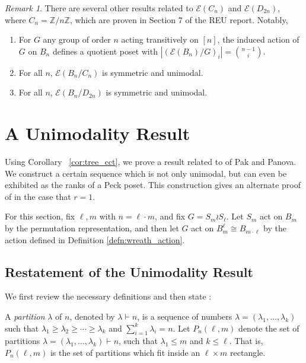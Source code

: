 \documentclass[smallextended, envcountsame, numbook]{svjour3}
\theoremstyle{plain}
\theoremstyle{definition}
\theoremstyle{remark}
\newtheorem{rmk}[thm]{Remark}
\numberwithin{equation}{section}
\newcommand\ssec{\subsection}
\begin{document}
\begin{rmk}
There are several other results related to $\mathcal E(C_n)$ and $\mathcal E(D_{2n})$, where $C_n = \mathbb Z/n\mathbb Z$, which are proven in Section 7 of the REU report. Notably,
\begin{enumerate}
	\item For $G$ any group of order $n$ acting transitively on $[n]$, the induced action of $G$ on $B_n$ defines a quotient poset with $|(\mathcal E(B_n)/G)_i| = \binom {n-1} i$.
	\item For all $n$, $\mathcal E(B_n/C_n)$ is symmetric and unimodal.
	\item For all $n$, $\mathcal E(B_n/D_{2n})$ is symmetric and unimodal.
\end{enumerate}
\end{rmk}



\section{A Unimodality Result}\label{sec:wreath_product}

Using Corollary ~\ref{cor:tree_cct}, we prove a result related to \cite[Theorem 1.1]{pak} of Pak and Panova. We construct a certain sequence which is not only unimodal, but can even be exhibited as the ranks of a Peck poset. This construction gives an alternate proof of \cite[Theorem 1.1]{pak} in the case that $r = 1$.

For this section, fix $\ell,m$ with $n = \ell \cdot m$, and fix $G = S_m \wr S_\ell$. Let $S_m$ act on $B_m$ by the permutation representation, and then let $G$ act on $B_{m}^\ell\cong B_{m \cdot \ell}$ by the action defined in Definition \ref{defn:wreath_action}.

\ssec{Restatement of the Unimodality Result}
We first review the necessary definitions and then state \cite[Theorem 1.1]{pak}:

A {\it partition} $\lambda$ of $n$, denoted by $\lambda \vdash n$, is a sequence of numbers $\lambda = (\lambda_1,\ldots, \lambda_k)$ such that $\lambda_1 \geq \lambda_2 \geq \cdots \geq \lambda_k$ and $\sum_{i=1}^k \lambda_i = n$. Let $P_n(\ell,m)$ denote the set of partitions $\lambda = (\lambda_1,\ldots, \lambda_k) \vdash n$, such that $\lambda_1 \leq m$ and $k \leq \ell$. That is, $P_n(\ell,m)$ is the set of partitions which fit inside an $\ell \times m$ rectangle.
\end{document}

